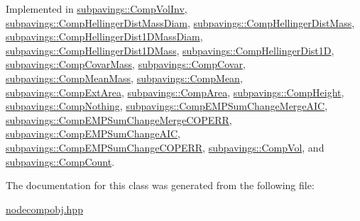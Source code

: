 \-Implemented in \hyperlink{classsubpavings_1_1CompVolInv_a9b031c839c3c330e4fcaa105c49975a6}{subpavings\-::\-Comp\-Vol\-Inv}, \hyperlink{classsubpavings_1_1CompHellingerDistMassDiam_a45fc3314836372332027716de71698b5}{subpavings\-::\-Comp\-Hellinger\-Dist\-Mass\-Diam}, \hyperlink{classsubpavings_1_1CompHellingerDistMass_a794cd9023bb26a82015aff89492e9cca}{subpavings\-::\-Comp\-Hellinger\-Dist\-Mass}, \hyperlink{classsubpavings_1_1CompHellingerDist1DMassDiam_aa5d0f459f73a7c5abb7c3c47b846a7a7}{subpavings\-::\-Comp\-Hellinger\-Dist1\-D\-Mass\-Diam}, \hyperlink{classsubpavings_1_1CompHellingerDist1DMass_a9b8a611439eef8ab2cb3c71315b2cf5f}{subpavings\-::\-Comp\-Hellinger\-Dist1\-D\-Mass}, \hyperlink{classsubpavings_1_1CompHellingerDist1D_a557adaeb83fb64c6f1a290fa31147ec8}{subpavings\-::\-Comp\-Hellinger\-Dist1\-D}, \hyperlink{classsubpavings_1_1CompCovarMass_a3207e61acd3b49bcd678a46870c89766}{subpavings\-::\-Comp\-Covar\-Mass}, \hyperlink{classsubpavings_1_1CompCovar_ad0aa69ba754de16c776d3dcf7e415495}{subpavings\-::\-Comp\-Covar}, \hyperlink{classsubpavings_1_1CompMeanMass_a160308bb8acb75a4c8efe4bae9efc962}{subpavings\-::\-Comp\-Mean\-Mass}, \hyperlink{classsubpavings_1_1CompMean_a34ecf892bad19d5c794d13ce808efda5}{subpavings\-::\-Comp\-Mean}, \hyperlink{classsubpavings_1_1CompExtArea_aad6bf360d9d1e6b4b44bccbba839d6c2}{subpavings\-::\-Comp\-Ext\-Area}, \hyperlink{classsubpavings_1_1CompArea_a8246a4db51101728675b010f57d68837}{subpavings\-::\-Comp\-Area}, \hyperlink{classsubpavings_1_1CompHeight_a28bfee172ba99fc11db08cedc61db733}{subpavings\-::\-Comp\-Height}, \hyperlink{classsubpavings_1_1CompNothing_a61b201695d7212edb08504c0127b4f65}{subpavings\-::\-Comp\-Nothing}, \hyperlink{classsubpavings_1_1CompEMPSumChangeMergeAIC_a85af532940cbe2ccfdd277e2eea682eb}{subpavings\-::\-Comp\-E\-M\-P\-Sum\-Change\-Merge\-A\-I\-C}, \hyperlink{classsubpavings_1_1CompEMPSumChangeMergeCOPERR_a74068f89bb79484997ef9819ebdb0e5b}{subpavings\-::\-Comp\-E\-M\-P\-Sum\-Change\-Merge\-C\-O\-P\-E\-R\-R}, \hyperlink{classsubpavings_1_1CompEMPSumChangeAIC_aeea99de2697cb8c31c4a6e31556f8356}{subpavings\-::\-Comp\-E\-M\-P\-Sum\-Change\-A\-I\-C}, \hyperlink{classsubpavings_1_1CompEMPSumChangeCOPERR_ac17c58f07320c227e1baf9b968445e2f}{subpavings\-::\-Comp\-E\-M\-P\-Sum\-Change\-C\-O\-P\-E\-R\-R}, \hyperlink{classsubpavings_1_1CompVol_a6536133bf17bcc1c37b5e6f15fa6d175}{subpavings\-::\-Comp\-Vol}, and \hyperlink{classsubpavings_1_1CompCount_a5c54d25893dc9d280a13fe91ee4af5ec}{subpavings\-::\-Comp\-Count}.



\-The documentation for this class was generated from the following file\-:\begin{DoxyCompactItemize}
\item 
\hyperlink{nodecompobj_8hpp}{nodecompobj.\-hpp}\end{DoxyCompactItemize}
